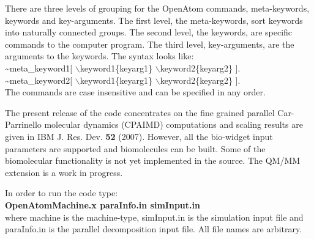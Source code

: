 There are three levels of grouping for the OpenAtom commands, 
meta-keywords, keywords and key-arguments.
The first level, the meta-keywords, sort keywords into naturally
connected groups. The second level, the keywords, are specific
commands to the computer program. The third level, key-arguments,
are the arguments to the keywords.  The syntax looks like: \\ 
\hspace*{0.5in} \~{}meta\_keyword1[ $\backslash$keyword1\{keyarg1\}
$\backslash$keyword2\{keyarg2\} ]. \\
\hspace*{0.5in} \~{}meta\_keyword2[ $\backslash$keyword1\{keyarg1\}
$\backslash$keyword2\{keyarg2\} ]. \\
The commands are case insensitive and can be specified in any order.

The present release of the code concentrates on the fine grained
parallel Car-Parrinello molecular dynamics (CPAIMD) computations 
and scaling results are given in IBM J. Res. Dev. {\bf 52} (2007). 
However, all the 
bio-widget input parameters are supported and biomolecules can be
built. Some of the biomolecular functionality is not yet implemented
in the source. The QM/MM extension is a work in progress.

In order to run the code type: \\
\hspace*{1.5in} {\bf OpenAtomMachine.x paraInfo.in simInput.in} \\
where machine is the machine-type, simInput.in is the simulation input
file and paraInfo.in is the parallel decomposition input file. 
All file names are arbitrary.

